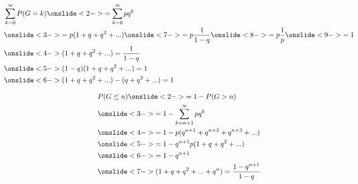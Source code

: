 \documentclass[20pt,xcolor={dvipsnames}]{beamer}
\begin{document}
\begin{frame}

\begin{align*} 
& \sum_{k=0}^{\infty}{P(G=k)} \onslide<2->{=\sum_{k=0}^{\infty}pq^k} \\
& \onslide<3->{=p(1+q+q^2+...)} \onslide<7->{=p\frac{1}{1-q}}\onslide<8->{= p\frac{1}{p}}\onslide<9->{=1} \\
& \onslide<4->{(1+q+q^2+...) = \frac{1}{1-q}} \\
& \onslide<5->{(1-q)(1+q+q^2+...) = 1} \\
& \onslide<6->{(1+q+q^2+...) - (q+q^2+...) = 1} \\
\end{align*}

\end{frame}

\begin{frame}

\begin{align*} 
& P(G\leq n) \onslide<2->{=1-P(G > n)} \\
& \onslide<3->{=1-\sum_{k=n+1}^{\infty}pq^k} \\
& \onslide<4->{=1-p(q^{n+1}+q^{n+2}+q^{n+3}+...)}\\
& \onslide<5->{=1-q^{n+1}p(1+q+q^2+...)}\\
& \onslide<6->{=1-q^{n+1}} \\
& \onslide<7->{(1+q+q^2+...+q^n) = \frac{1-q^{n+1}}{1-q}} \\
\end{align*}

\end{frame}

\end{document}
